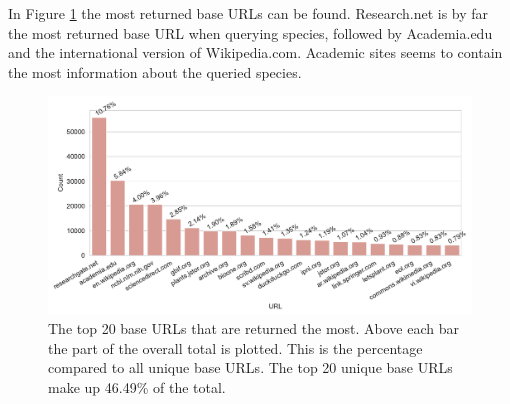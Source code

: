 \documentclass[a4paper, 12pt, oneside]{book} %
\begin{document}
In Figure \ref{fig:URL_top20} the most returned base URLs can be found.
Research.net is by far the most returned base URL when querying species, followed by Academia.edu and the international version of Wikipedia.com.
Academic sites seems to contain the most information about the queried species.
\begin{figure}[t]
 \centering
 \includegraphics[width=\textwidth]{figures/URL_top20.pdf}
 \caption[The top 20 returned base URLs]{The top 20 base URLs that are returned the most. Above each bar the part of the overall total is plotted. This is the percentage compared to all unique base URLs. The top 20 unique base URLs make up 46.49\% of the total.}
 \label{fig:URL_top20}
\end{figure}
\end{document}
